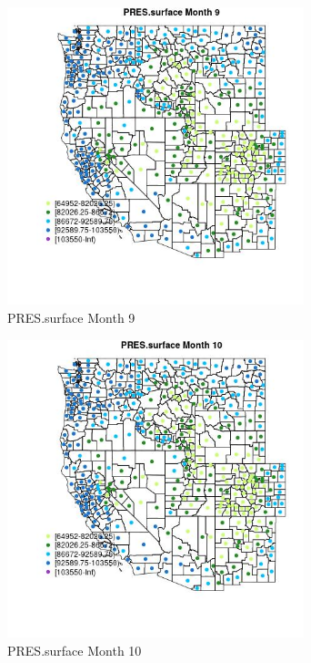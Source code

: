 \begin{figure} 
\centering  
\includegraphics[width=0.77\textwidth]{Code_Outputs/df_report_ML_predictors_CountyCentroid_Locations_Dates_2008-01-01to2018-12-31_MapObsMo9PRESsurface.jpg} 
\caption{\label{fig:df_report_ML_predictors_CountyCentroid_Locations_Dates_2008-01-01to2018-12-31MapObsMo9PRESsurface}PRES.surface Month 9} 
\end{figure} 
 

\begin{figure} 
\centering  
\includegraphics[width=0.77\textwidth]{Code_Outputs/df_report_ML_predictors_CountyCentroid_Locations_Dates_2008-01-01to2018-12-31_MapObsMo10PRESsurface.jpg} 
\caption{\label{fig:df_report_ML_predictors_CountyCentroid_Locations_Dates_2008-01-01to2018-12-31MapObsMo10PRESsurface}PRES.surface Month 10} 
\end{figure} 
 

